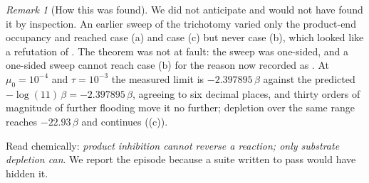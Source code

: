 \documentclass[11pt,twocolumn,a4paper]{article}
\theoremstyle{thmstyle}
\theoremstyle{definition}
\theoremstyle{remark}
\newtheorem{remark}[theorem]{Remark}
\newcommand{\flo}{\beta}
\begin{document}
\begin{remark}[How this was found]
\label{rem:saturation-found}
We did not anticipate  and would not have found it by
inspection. An earlier sweep of the trichotomy varied only the product-end
occupancy and reached case (a) and case (c) but never case (b), which looked
like a refutation of . The theorem was not at fault: the
sweep was one-sided, and a one-sided sweep cannot reach case (b) for the
reason now recorded as . At $\mu_0=10^{-4}$ and
$\tau=10^{-3}$ the measured limit is $-2.397895\,\flo$ against the predicted
$-\log(11)\,\flo = -2.397895\,\flo$, agreeing to six decimal places, and
thirty orders of magnitude of further flooding move it no further; depletion
over the same range reaches $-22.93\,\flo$ and continues
((c)).

Read chemically: \emph{product inhibition cannot reverse a reaction; only
substrate depletion can}. We report the episode because a suite written to
pass would have hidden it.
\end{remark}
\end{document}

